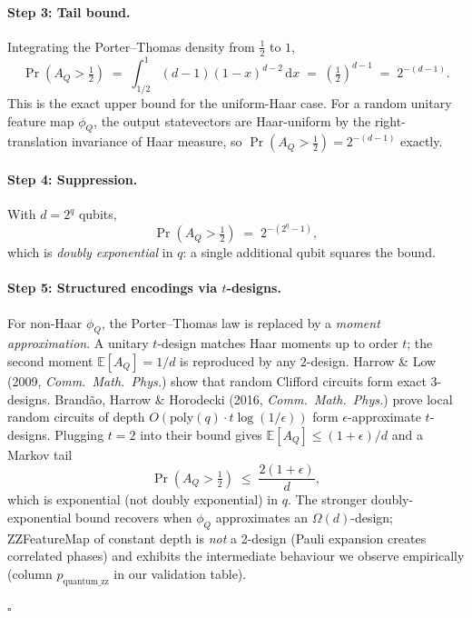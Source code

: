 \documentclass[11pt,a4paper]{article}
\newcommand{\E}{\mathbb{E}}
\begin{document}
\paragraph{Step 3: Tail bound.}
Integrating the Porter--Thomas density from $\tfrac12$ to $1$,
\[
  \Pr(A_Q>\tfrac12)
  \;=\;\int_{1/2}^{1}(d-1)(1-x)^{d-2}\,\mathrm{d}x
  \;=\;(\tfrac12)^{d-1}
  \;=\;2^{-(d-1)}.
\]
This is the exact upper bound for the uniform-Haar case. For a random
unitary feature map $\phi_Q$, the output statevectors are Haar-uniform
by the right-translation invariance of Haar measure, so
$\Pr(A_Q>\tfrac12)=2^{-(d-1)}$ exactly.

\paragraph{Step 4: Suppression.}
With $d=2^{q}$ qubits,
\[
  \Pr(A_Q>\tfrac12) \;=\; 2^{-(2^{q}-1)},
\]
which is \emph{doubly exponential} in $q$: a single additional qubit
squares the bound.

\paragraph{Step 5: Structured encodings via $t$-designs.}
For non-Haar $\phi_Q$, the Porter--Thomas law is replaced by a
\emph{moment approximation}. A unitary $t$-design matches Haar moments
up to order $t$; the second moment $\E[A_Q]=1/d$ is reproduced by any
$2$-design. Harrow \& Low (2009, \emph{Comm.\ Math.\ Phys.})
show that random Clifford circuits form exact 3-designs. Brand\~ao,
Harrow \& Horodecki (2016, \emph{Comm.\ Math.\ Phys.}) prove local
random circuits of depth $O(\mathrm{poly}(q)\cdot t\log(1/\epsilon))$
form $\epsilon$-approximate $t$-designs. Plugging $t=2$ into their
bound gives $\E[A_Q]\le (1+\epsilon)/d$ and a Markov tail
\[
  \Pr(A_Q>\tfrac12) \;\le\; \frac{2(1+\epsilon)}{d},
\]
which is exponential (not doubly exponential) in $q$.
The stronger doubly-exponential bound recovers when $\phi_Q$ approximates
an $\Omega(d)$-design; ZZFeatureMap of constant depth is \emph{not}
a 2-design (Pauli expansion creates correlated phases) and exhibits
the intermediate behaviour we observe empirically
(column $p_{\text{quantum\_zz}}$ in our validation table).

\hfill$\square$
\end{document}
